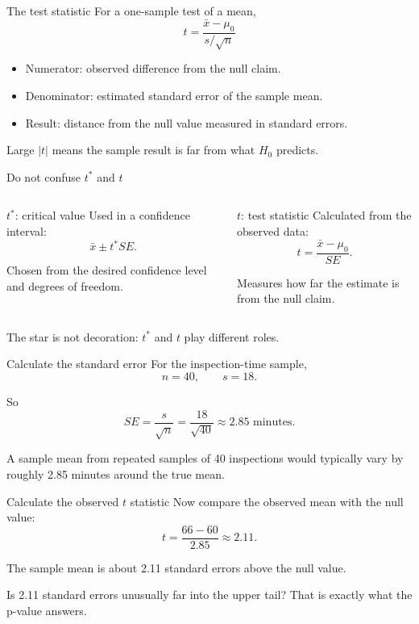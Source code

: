 \documentclass[11pt,aspectratio=169]{beamer}
\begin{document}
\begin{frame}{The test statistic}
For a one-sample test of a mean,
\[
\boxed{t=\frac{\bar{x}-\mu_0}{s/\sqrt{n}}}
\]

\begin{itemize}
  \item Numerator: observed difference from the null claim.
  \item Denominator: estimated standard error of the sample mean.
  \item Result: distance from the null value measured in \alert{standard errors}.
\end{itemize}

\vfill
Large $|t|$ means the sample result is far from what $H_0$ predicts.
\end{frame}

\begin{frame}{Do not confuse $t^*$ and $t$}
\begin{columns}[T,onlytextwidth]
\begin{block}{$t^*$: critical value}
Used in a confidence interval:
\[
\bar{x}\pm t^*SE.
\]

Chosen from the desired confidence level and degrees of freedom.
\end{block}
\begin{alertblock}{$t$: test statistic}
Calculated from the observed data:
\[
t=\frac{\bar{x}-\mu_0}{SE}.
\]

Measures how far the estimate is from the null claim.
\end{alertblock}
\end{columns}

\vfill
\alert{The star is not decoration: $t^*$ and $t$ play different roles.}
\end{frame}

\begin{frame}{Calculate the standard error}
For the inspection-time sample,
\[
n=40,\qquad s=18.
\]

So
\[
SE=\frac{s}{\sqrt{n}}
=\frac{18}{\sqrt{40}}
\approx2.85\text{ minutes}.
\]

\vfill
A sample mean from repeated samples of 40 inspections would typically vary by roughly 2.85 minutes around the true mean.
\end{frame}

\begin{frame}{Calculate the observed $t$ statistic}
Now compare the observed mean with the null value:
\[
t=\frac{66-60}{2.85}
\approx2.11.
\]

\begin{center}
\Large The sample mean is about \alert{2.11 standard errors above} the null value.
\end{center}

\vfill
Is 2.11 standard errors unusually far into the upper tail? That is exactly what the p-value answers.
\end{frame}
\end{document}
